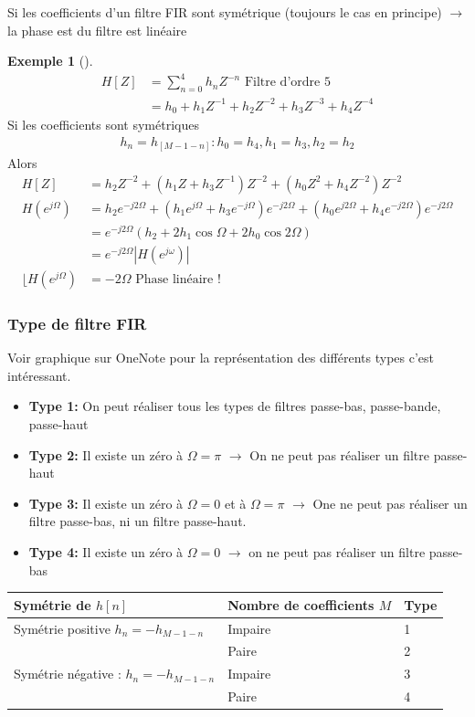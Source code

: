 \documentclass{article}
\theoremstyle{plain}%
\theoremstyle{definition}
\newtheorem{exmp}{Exemple}[section]
\theoremstyle{remark}
\begin{document}
Si les coefficients d'un filtre FIR sont symétrique (toujours le cas en principe) $\rightarrow$ la phase est du filtre est linéaire 
\begin{exmp}[]
    \begin{align*}
        H[Z] &= \sum_{n=0}^{4}h_n Z^{-n} \text{ Filtre d'ordre 5} \\
            &= h_0 + h_1 Z^{-1} + h_2 Z^{-2} + h_3 Z^{-3} + h_4 Z^{-4}
    \end{align*}
    Si les coefficients sont symétriques 
    \begin{align*}
        h_n = h_[M-1-n] :  h_0 = h_4, h_1 = h_3, h_2 = h_2
    \end{align*}
    Alors 
    \begin{align*}
        H[Z] &= h_2 Z^{-2} + (h_1 Z + h_3 Z^{-1}) Z^{-2} + (h_0 Z^2 + h_4 Z^{-2})Z^{-2} \\ 
        H(e^{j \Omega }) &= h_2 e^{-j 2\Omega } + (h_1e^{j \Omega } + h_3 e^{-j \Omega })e^{-j 2\Omega } + (h_0 e^{j 2\Omega } + h_4 e^{-j 2\Omega }) e^{-j 2\Omega } \\ 
            &= e^{-j 2\Omega }(h_2 + 2h_1 \cos \Omega + 2 h_0 \cos 2 \Omega ) \\ 
            &= e^{-j 2\Omega } \left| H(e^{j \omega }) \right| \\
        \lfloor H(e^{j \Omega }) &= -2 \Omega \text{ Phase linéaire !}
    \end{align*}
\end{exmp}

\subsubsection{Type de filtre FIR}
Voir graphique sur OneNote pour la représentation des différents types c'est intéressant.
\begin{itemize}
    \item \textbf{Type 1:} On peut réaliser tous les types de filtres passe-bas, passe-bande, passe-haut
    \item \textbf{Type 2:} Il existe un zéro à $ \Omega = \pi  $ $\rightarrow$ On ne peut pas réaliser un filtre passe-haut
    \item \textbf{Type 3:} Il existe un zéro à $ \Omega = 0 $ et à $ \Omega = \pi  $ $\rightarrow$ One ne peut pas réaliser un filtre passe-bas, ni un filtre passe-haut.
    \item \textbf{Type 4:} Il existe un zéro à $ \Omega = 0 $ $\rightarrow$ on ne peut pas réaliser un filtre passe-bas
\end{itemize}
\begin{table}[!ht]
    \centering
    \begin{tabular}{|l|l|l|}
    \hline
        Symétrie de $h[n]$ & Nombre de coefficients $M$ & Type \\ \hline
        Symétrie positive $ h_n = - h_{M-1-n} $ & Impaire & 1 \\ \hline
        ~ & Paire & 2 \\ \hline
        Symétrie négative : $ h_n = - h_{M-1-n} $  & Impaire & 3 \\ \hline
        ~ & Paire & 4 \\ \hline
    \end{tabular}
\end{table}
\end{document}

